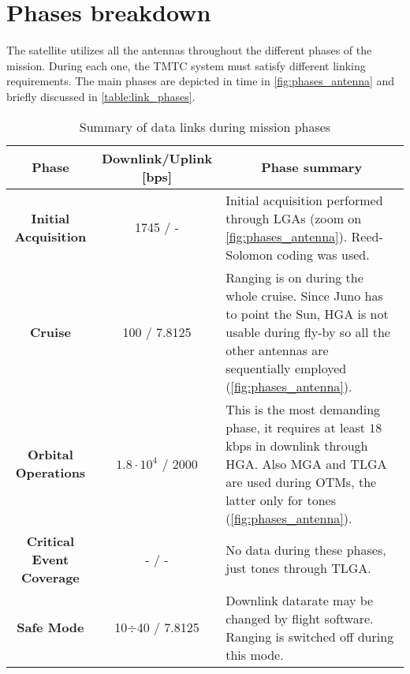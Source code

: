 \section{Phases breakdown}
\label{sec:phases_breakdown}

The satellite utilizes all the antennas throughout the different phases of the mission. During each one, the TMTC system must satisfy different linking requirements. The main phases are depicted in time in \autoref{fig:phases_antenna} and briefly discussed in \autoref{table:link_phases}. 
% 


\begin{table}[H]
    \renewcommand{\arraystretch}{1.7}
    \centering
    \begin{tabularx}{\linewidth}{|c|c|X|}
        \hline
        \textbf{Phase} & \textbf{Downlink/Uplink [bps]} &  \multicolumn{1}{|c|}{\textbf{Phase summary}}  \\
        \hline
        \hline
        \textbf{Initial Acquisition} & 1745 / - & 
        Initial acquisition performed through LGAs \newline (zoom on \autoref{fig:phases_antenna}). Reed-Solomon coding was used. \\ 
        \hline
        \textbf{Cruise} & 100 / 7.8125 & 
        Ranging is on during the whole cruise. Since Juno has to point the Sun, HGA is not usable during fly-by so all the other antennas are sequentially employed (\autoref{fig:phases_antenna}). \\
        \hline
        \textbf{Orbital Operations} & $1.8 \cdot 10^{4} $ / 2000 & 
        This is the most demanding phase, it requires at least $18$ kbps in downlink through HGA. Also MGA and TLGA are used during OTMs, the latter only for tones (\autoref{fig:phases_antenna}). \\
        \hline
        \textbf{Critical Event Coverage} & - / - & No data during these phases, just tones through TLGA.\\
        \hline
        \textbf{Safe Mode} & 10$\div$40 / 7.8125 &
        Downlink datarate may be changed by flight software. Ranging is switched off during this mode. \\
        \hline
    \end{tabularx}
    \caption{Summary of data links during mission phases \cite{juno_telecommunication}}
    \label{table:link_phases}
\end{table}
